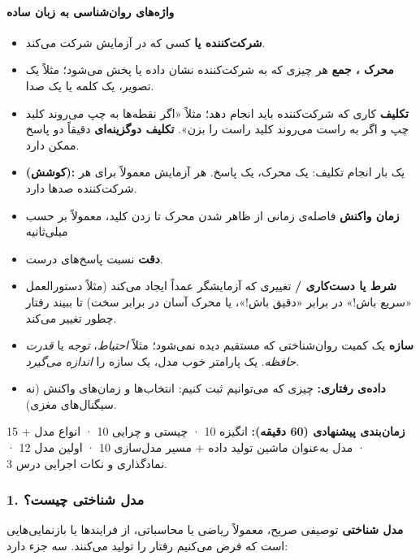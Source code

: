 \paragraph{واژه‌های روان‌شناسی به زبان ساده}

\begin{itemize}
\tightlist
\item
  \textbf{شرکت‌کننده  یا } کسی که در
  آزمایش شرکت می‌کند.
\item
  \textbf{محرک ، جمع } هر چیزی که به
  شرکت‌کننده نشان داده یا پخش می‌شود؛ مثلاً یک تصویر، یک کلمه یا یک صدا.
\item
  \textbf{تکلیف } کاری که شرکت‌کننده باید انجام دهد؛ مثلاً
  «اگر نقطه‌ها به چپ می‌روند کلید چپ و اگر به راست می‌روند کلید راست را
  بزن». \textbf{تکلیف دوگزینه‌ای} دقیقاً دو پاسخ ممکن دارد.
\item
  \textbf{ (کوشش):} یک بار انجام تکلیف: یک محرک، یک پاسخ. هر
  آزمایش معمولاً برای هر شرکت‌کننده صدها  دارد.
\item
  \textbf{زمان واکنش } فاصله‌ی زمانی از ظاهر شدن محرک تا زدن
  کلید، معمولاً بر حسب میلی‌ثانیه 
\item
  \textbf{دقت } نسبت پاسخ‌های درست.
\item
  \textbf{شرط یا دست‌کاری  / } تغییری
  که آزمایشگر عمداً ایجاد می‌کند (مثلاً دستورالعمل «سریع باش!» در برابر
  «دقیق باش!»، یا محرک آسان در برابر سخت) تا ببیند رفتار چطور تغییر
  می‌کند.
\item
  \textbf{سازه } یک کمیت روان‌شناختی که مستقیم دیده
  نمی‌شود؛ مثلاً \emph{احتیاط}، \emph{توجه} یا \emph{قدرت حافظه}. یک
  پارامتر خوب مدل، یک سازه را \emph{اندازه می‌گیرد}.
\item
  \textbf{داده‌ی رفتاری:} چیزی که می‌توانیم ثبت کنیم: انتخاب‌ها و زمان‌های
  واکنش (نه سیگنال‌های مغزی).
\end{itemize}

\textbf{زمان‌بندی پیشنهادی (60 دقیقه):} انگیزه 10 · چیستی و چرایی 10 ·
انواع مدل +  15 · مدل به‌عنوان ماشین تولید داده + مسیر مدل‌سازی
10 · اولین مدل  12 · نمادگذاری و نکات اجرایی درس 3.

\subsubsection{1. مدل شناختی چیست؟}

\textbf{مدل شناختی} توصیفی صریح، معمولاً ریاضی یا محاسباتی، از فرایندها
یا بازنمایی‌هایی است که فرض می‌کنیم رفتار را تولید می‌کنند. سه جزء دارد:

